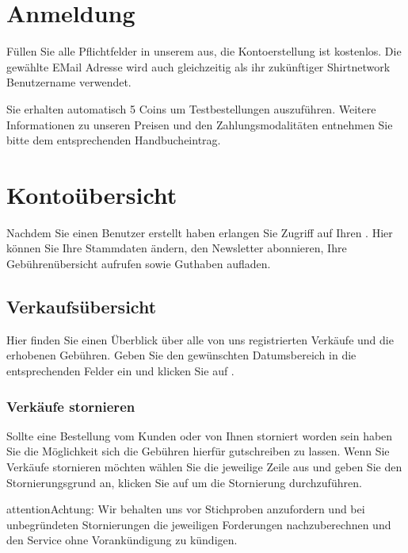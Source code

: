 \documentclass[letterpaper,10pt,ngerman]{sphinxmanual}
\begin{document}
\section{Anmeldung}
\label{\detokenize{intro/register:anmeldung}}\label{\detokenize{intro/register::doc}}
Füllen Sie alle Pflichtfelder in unserem  aus, die Kontoerstellung ist kostenlos.
Die gewählte E\sphinxhyphen{}Mail Adresse wird auch gleichzeitig als ihr zukünftiger Shirtnetwork Benutzername verwendet.

Sie erhalten automatisch 5 Coins um Testbestellungen auszuführen.
Weitere Informationen zu unseren Preisen und den Zahlungsmodalitäten entnehmen Sie bitte dem entsprechenden Handbucheintrag.


\section{Kontoübersicht}
\label{\detokenize{intro/account:kontoubersicht}}\label{\detokenize{intro/account::doc}}
Nachdem Sie einen Benutzer erstellt haben erlangen Sie Zugriff auf Ihren . Hier können Sie Ihre Stammdaten
ändern, den Newsletter abonnieren, Ihre Gebührenübersicht aufrufen sowie Guthaben aufladen.


\subsection{Verkaufsübersicht}
\label{\detokenize{intro/account:verkaufsubersicht}}
Hier finden Sie einen Überblick über alle von uns registrierten Verkäufe und die erhobenen Gebühren.
Geben Sie den gewünschten Datumsbereich in die entsprechenden Felder ein und klicken Sie auf .


\subsubsection{Verkäufe stornieren}
\label{\detokenize{intro/account:verkaufe-stornieren}}
Sollte eine Bestellung vom Kunden oder von Ihnen storniert worden sein haben Sie die Möglichkeit sich
die Gebühren hierfür gutschreiben zu lassen. Wenn Sie Verkäufe stornieren möchten wählen Sie die jeweilige Zeile aus und geben Sie den Stornierungsgrund an,
klicken Sie auf  um die Stornierung durchzuführen.

\begin{sphinxadmonition}{attention}{Achtung:}
Wir behalten uns vor Stichproben anzufordern und bei unbegründeten Stornierungen die jeweiligen Forderungen nachzuberechnen und den Service ohne Vorankündigung zu kündigen.
\end{sphinxadmonition}
\end{document}
